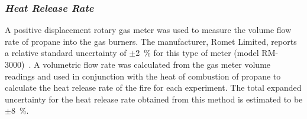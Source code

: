 \subsubsection*{\textit{Heat Release Rate}}
A positive displacement rotary gas meter was used to measure the volume flow rate of propane into the gas burners. The manufacturer, Romet Limited, reports a relative standard uncertainty of $\pm$2~\% for this type of meter (model RM-3000)~\cite{Romet:2014}. A volumetric flow rate was calculated from the gas meter volume readings and used in conjunction with the heat of combustion of propane to calculate the heat release rate of the fire for each experiment. The total expanded uncertainty for the heat release rate obtained from this method is estimated to be $\pm8$~\%.